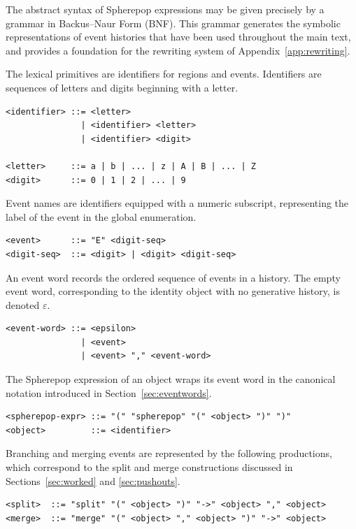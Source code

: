 \documentclass[12pt]{article}
\theoremstyle{plain}
\theoremstyle{definition}
\theoremstyle{remark}
\begin{document}
The abstract syntax of Spherepop expressions may be given precisely by a
grammar in Backus--Naur Form (BNF).  This grammar generates the symbolic
representations of event histories that have been used throughout the main
text, and provides a foundation for the rewriting system of
Appendix~\ref{app:rewriting}.

The lexical primitives are identifiers for regions and events.  Identifiers
are sequences of letters and digits beginning with a letter.

\begin{verbatim}
<identifier> ::= <letter>
               | <identifier> <letter>
               | <identifier> <digit>

<letter>     ::= a | b | ... | z | A | B | ... | Z
<digit>      ::= 0 | 1 | 2 | ... | 9
\end{verbatim}

Event names are identifiers equipped with a numeric subscript, representing
the label of the event in the global enumeration.

\begin{verbatim}
<event>      ::= "E" <digit-seq>
<digit-seq>  ::= <digit> | <digit> <digit-seq>
\end{verbatim}

An event word records the ordered sequence of events in a history.  The empty
event word, corresponding to the identity object with no generative history,
is denoted $\varepsilon$.

\begin{verbatim}
<event-word> ::= <epsilon>
               | <event>
               | <event> "," <event-word>
\end{verbatim}

The Spherepop expression of an object wraps its event word in the canonical
notation introduced in Section~\ref{sec:eventwords}.

\begin{verbatim}
<spherepop-expr> ::= "(" "spherepop" "(" <object> ")" ")"
<object>         ::= <identifier>
\end{verbatim}

Branching and merging events are represented by the following productions,
which correspond to the split and merge constructions discussed in
Sections~\ref{sec:worked} and \ref{sec:pushouts}.

\begin{verbatim}
<split>  ::= "split" "(" <object> ")" "->" <object> "," <object>
<merge>  ::= "merge" "(" <object> "," <object> ")" "->" <object>
\end{verbatim}
\end{document}
